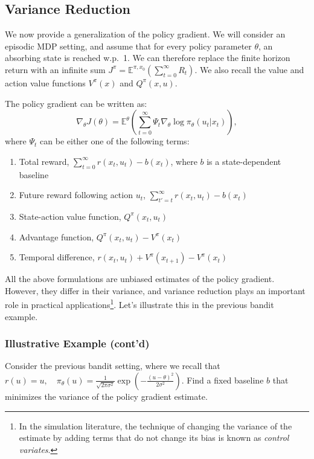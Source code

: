 \subsection{Variance Reduction}
We now provide a generalization of the policy gradient. We will consider an episodic MDP setting, and assume that for every policy parameter $\theta$, an absorbing state is reached w.p.~1. We can therefore replace the finite horizon return with an infinite sum ${J^\pi } = {\mathbb E^{\pi ,{x_0}}} \left(\sum\limits_{t = 0}^\infty {{R_t}} \right)$. We also recall the value and action value functions $V^\pi(x)$ and $Q^\pi(x,u)$. 
\begin{proposition}\label{prop:pg_control_variates}
The policy gradient can be written as:
\begin{equation*}
    \nabla_\theta J(\theta) = {\mathbb E^\theta }\left( \sum_{t=0}^\infty \Psi_t {{\nabla _\theta }\log {\pi _\theta }({u_t}|{x_t})} \right),
\end{equation*}
where $\Psi_t$ can be either one of the following terms:
\begin{enumerate}
    \item Total reward, $\sum_{t=0}^\infty r(x_t,u_t) - b(x_t)$, where $b$ is a state-dependent baseline
    \item Future reward following action $u_t$, $\sum_{t'=t}^\infty r(x_t,u_t) - b(x_t)$
    \item State-action value function, $Q^\pi(x_t,u_t)$
    \item Advantage function, $Q^\pi(x_t,u_t) - V^\pi(x_t)$
    \item Temporal difference, $r(x_t,u_t) + V^\pi(x_{t+1})- V^\pi(x_t)$
\end{enumerate}
\end{proposition}

All the above formulations are unbiased estimates of the policy gradient. However, they differ in their variance, and variance reduction plays an important role in practical applications\footnote{In the simulation literature, the technique of changing the variance of the estimate by adding terms that do not change its bias is known as \textit{control variates}.}. Let's illustrate this in the previous bandit example.

\subsubsection{Illustrative Example (cont'd)}
Consider the previous bandit setting, where we recall that
$        r(u) = u, \quad
        \pi_\theta(u) = \frac{1}{\sqrt{2 \pi \sigma^2}} \exp (- \frac{(u - \theta)^2}{2 \sigma^2}).$
Find a fixed baseline $b$ that minimizes the variance of the policy gradient estimate.

